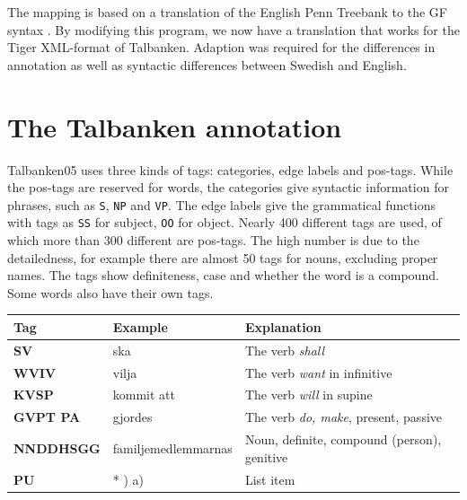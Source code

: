 \documentclass{report}
\begin{document}
The mapping is based on 
a translation of the English Penn Treebank to the GF syntax \cite{gfpenn}.
By modifying this program, we now have a translation that works for
the Tiger XML-format of
Talbanken. Adaption was required for the differences in annotation as well as 
syntactic differences between Swedish and English.

\section{The Talbanken annotation}
Talbanken05 uses three kinds of tags: categories, edge labels and pos-tags. 
While the pos-tags are reserved for words, the categories give syntactic information
for phrases, such as \verb|S|, \verb|NP| and \verb|VP|.
The edge labels give the grammatical functions with tags as \verb|SS| for subject, 
\verb|OO| for object. Nearly 400 different tags are used, of which more than
300 different are pos-tags. The high number is due to the detailedness, for
example there are almost 50 tags for nouns, excluding proper names. The tags
show definiteness, case and whether the word is a compound. Some words also have
their own tags.\\

\begin{tabular}{lll}
\textbf{Tag} & \textbf{Example} & \textbf{Explanation} \\
\hline
\textbf{SV} & ska & The verb \emph{shall}\\
\textbf{WVIV} & vilja & The verb \emph{want} in infinitive\\
\textbf{KVSP} & kommit att & The verb \emph{will} in supine\\
\textbf{GVPT  PA} & gjordes & The verb \emph{do, make}, present, passive \\
\textbf{NNDDHSGG} & familjemedlemmarnas & Noun, definite, compound (person), genitive \\
\textbf{PU} & * \; 1) \; a) & List item\\
\end{tabular}\\

\end{document}
